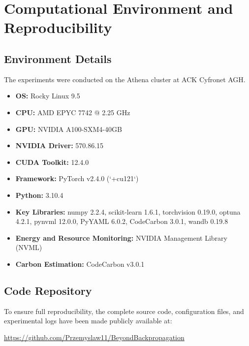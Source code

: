 \documentclass[letterpaper]{article}
\begin{document}
\section{Computational Environment and Reproducibility}
\label{app:environment_appendix}

\subsection{Environment Details}
The experiments were conducted on the Athena cluster at ACK Cyfronet AGH.
\begin{itemize}
    \item \textbf{OS:} Rocky Linux 9.5
    \item \textbf{CPU:} AMD EPYC 7742 @ 2.25 GHz
    \item \textbf{GPU:} NVIDIA A100-SXM4-40GB
    \item \textbf{NVIDIA Driver:} 570.86.15
    \item \textbf{CUDA Toolkit:} 12.4.0
    \item \textbf{Framework:} PyTorch v2.4.0 (`+cu121`)
    \item \textbf{Python:} 3.10.4
    \item \textbf{Key Libraries:} numpy 2.2.4, scikit-learn 1.6.1, torchvision 0.19.0, optuna 4.2.1, pynvml 12.0.0, PyYAML 6.0.2, CodeCarbon 3.0.1, wandb 0.19.8
    \item \textbf{Energy and Resource Monitoring:} NVIDIA Management Library (NVML)
    \item \textbf{Carbon Estimation:} CodeCarbon v3.0.1 \cite{codecarbon2021}
\end{itemize}

\subsection{Code Repository}
To ensure full reproducibility, the complete source code, configuration files, and experimental logs have been made publicly available at:
\begin{center}
    \url{https://github.com/Przemyslaw11/BeyondBackpropagation}
\end{center}
\end{document}

